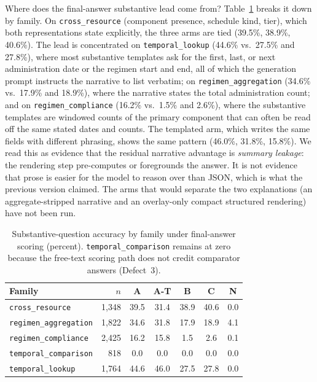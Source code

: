 Where does the final-answer substantive lead come from?  Table~\ref{tab:postthink_family}
breaks it down by family.  On \texttt{cross\_resource} (component presence, schedule
kind, tier), which both representations state explicitly, the three arms are tied
(39.5\%, 38.9\%, 40.6\%).  The lead is concentrated on \texttt{temporal\_lookup}
(44.6\% vs.\ 27.5\% and 27.8\%), where most substantive templates ask for the first, last,
or next administration date or the regimen start and end, all of which the generation
prompt instructs the narrative to list verbatim; on \texttt{regimen\_aggregation}
(34.6\% vs.\ 17.9\% and 18.9\%), where the narrative states the total administration
count; and on \texttt{regimen\_compliance} (16.2\% vs.\ 1.5\% and 2.6\%), where the
substantive templates are windowed counts of the primary component that can often be read
off the same stated dates and counts.  The templated arm, which writes the same fields
with different phrasing, shows the same pattern (46.0\%, 31.8\%, 15.8\%).  We read this as
evidence that the residual narrative advantage is \emph{summary leakage}: the rendering
step pre-computes or foregrounds the answer.  It is not evidence that prose is easier for
the model to reason over than JSON, which is what the previous version claimed.  The
arms that would separate the two explanations (an aggregate-stripped narrative and an
overlay-only compact structured rendering) have not been run.

\begin{table}[htbp]
\centering
\caption{Substantive-question accuracy by family under final-answer scoring (percent).
\texttt{temporal\_comparison} remains at zero because the free-text scoring path does
not credit comparator answers (Defect~3).}
\label{tab:postthink_family}
\begin{tabular}{lrccccc}
\toprule
Family & $n$ & A & A-T & B & C & N \\
\midrule
\texttt{cross\_resource}      & 1{,}348 & 39.5 & 31.4 & 38.9 & 40.6 & 0.0 \\
\texttt{regimen\_aggregation} & 1{,}822 & 34.6 & 31.8 & 17.9 & 18.9 & 4.1 \\
\texttt{regimen\_compliance}  & 2{,}425 & 16.2 & 15.8 &  1.5 &  2.6 & 0.1 \\
\texttt{temporal\_comparison} &   818   &  0.0 &  0.0 &  0.0 &  0.0 & 0.0 \\
\texttt{temporal\_lookup}     & 1{,}764 & 44.6 & 46.0 & 27.5 & 27.8 & 0.0 \\
\bottomrule
\end{tabular}
\end{table}

